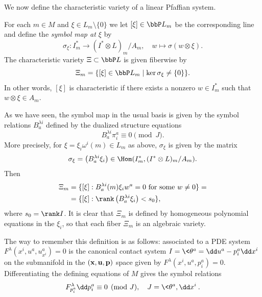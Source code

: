 We now define the characteristic variety of a linear Pfaffian system.

\begin{defn}
    For each $m\in M$ and $\xi\in L_m\setminus\{0\}$ we let $[\xi]\in \bbP L_m$ be the corresponding line and define the \emph{symbol map at $\xi$} by
    \[\sigma_\xi:I^\ast_m \to (I^\ast \otimes L)_m\slash A_m,\quad w\mapsto \sigma(w\otimes \xi).\]
    The characteristic variety $\Xi\subset\bbP L$ is given fiberwise by 
    \[\Xi_m=\{[\xi]\in \bbP L_m\mid \ker \sigma_\xi\neq \{0\}\}.\]
    In other words, $[\xi]$ is characteristic if there exists a nonzero $w\in I^\ast_m$ such that $w\otimes\xi\in A_m$.
\end{defn}

As we have seen, the symbol map in the usual basis is given by the symbol relations $B^{\lambda i}_a$ defined by the dualized structure equations 
\[B^{\lambda i}_a\pi^a_i\equiv 0\pmod{J}.\]
More precisely, for $\xi=\xi_i\omega^i(m)\in L_m$ as above, $\sigma_\xi$ is given by the matrix
\[\sigma_\xi=\left(B^{\lambda i}_a \xi_i\right)\in \Hom(I^\ast_m,(I^\ast \otimes L)_m\slash A_m).\]
Then 
\begin{align}
    \Xi_m&=\{[\xi]:B^{\lambda i}_a(m)\xi_i w^a=0\text{ for some }w\neq 0\}=\\
    &=\{[\xi]:\rank\left(B^{\lambda i}_a \xi_i\right)<s_0\},
\end{align}
where $s_0=\rank I$. It is clear that $\Xi_m$ is defined by homogeneous polynomial equations in the $\xi_i$, so that each fiber $\Xi_m$ is an algebraic variety.

\begin{rem}
    The way to remember this definition is as follows: associated to a PDE system $F^\lambda(x^i,u^a,u^a_{x^i})=0$ is the canonical contact system $I=\<\theta^a=\dd u^a-p^a_i\dd x^i\>$ on the submanifold in the $(\bf{x},\bf{u},\bf{p})$ space given by $F^\lambda(x^i,u^a,p^a_i)=0$. Differentiating the defining equations of $M$ gives the symbol relations 
    \[F^\lambda_{p^a_i}\dd p^a_i\equiv 0\pmod{J},\quad J=\<\theta^a,\dd x^i\>.\]
\end{rem}

